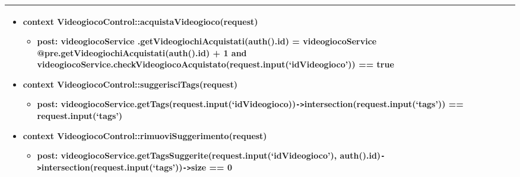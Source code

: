 \begin{tabular}{|| l | p{28em} ||}
\begin{itemize}[leftmargin=*]
	\item \textbf{context} VideogiocoControl::acquistaVideogioco(request)
	\begin{itemize}
		\item[ ] \textbf{post:} videogiocoService
		.getVideogiochiAcquistati(auth().id) =
		videogiocoService\newline 
		@pre.getVideogiochiAcquistati(auth().id) + 1
		and videogiocoService.\newline checkVideogiocoAcquistato(request.input(‘idVideogioco’)) == true	
	\end{itemize}

	\item \textbf{context} VideogiocoControl::suggerisciTags(request)
	\begin{itemize}
		\item[ ] \textbf{post:} videogiocoService\newline .getTags(request.input(‘idVideogioco))\newline \verb|->|intersection(request.input(‘tags’)) == request.input(‘tags’)
	\end{itemize}

	\item \textbf{context} VideogiocoControl::rimuoviSuggerimento(request)
	\begin{itemize}
		\item[ ] \textbf{post:} videogiocoService.getTagsSuggerite(request.input(‘idVideogioco’), auth().id)\verb|->|intersection(request.input(‘tags’))\verb|->|size == 0
	\end{itemize}
\end{itemize}\\
\hline
\end{tabular}

\newpage
